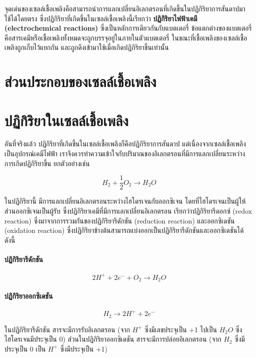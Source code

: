 \message{ !name(solar.tex)}\documentclass[
a4paper,
svgnames,
openany,
justified,
]{tufte-book}
\begin{document}
จุดเด่นของเซลล์เชื้อเพลิงคือสามารถนำการแลกเปลี่ยนอิเลกตรอนที่เกิดขึ้นในปฏิกิริยาการสันดาปมาใช้ได้โดยตรง ซึ่งปฏิกิริยาที่เกิดขึ้นในเซลล์เชื้อเพลิงนี้เรียกว่า \textbf{ปฏิกิริยาไฟฟ้าเคมี (electrochemical reactions)} ซึ่งเป็นหลักการเดียวกันกับแบตเตอรี่ ข้อแตกต่างของแบตเตอรี่คือสารเคมีหรือเชื้อเพลิงทั้งหมดจะถูกบรรจุอยู่ในภายในตัวแบตเตอรี่ ในขณะที่เชื้อเพลิงของเซลล์เชื้อเพลิงถูกเก็บไว้แยกกัน และถูกดึงเข้ามาใช้เมื่อเกิดปฏิกิริยาขึ้นเท่านั้น

\section{ส่วนประกอบของเซลล์เชื้อเพลิง}

\section{ปฏิกิริยาในเซลล์เชื้อเพลิง}

อันที่จริงแล้ว ปฎิกิริยาที่เกิดขึ้นในเซลล์เชื้อเพลิงก็คือปฏิกิริยาการสันดาป แต่เนื่องจากเซลล์เชื้อเพลิงเป็นอุปกรณ์เคมีไฟฟ้า เราจึงควรทำความเข้าใจกับปริมาณของอิเลกตรอนที่มีการแลกเปลี่ยนระหว่างการเกิดปฏิกิริยาขึ้น ยกตัวอย่างเช่น

$$ H_2 + \frac{1}{2} O_2 \rightarrow H_2O $$

ในปฏิกิริยานี้ มีการแลกเปลี่ยนอิเลกตรอนระหว่างไฮโดรเจนกับออกซิเจน โดยที่ไฮโดรเจนเป็นผู้ให้ ส่วนออกซิเจนเป็นผู้รับ ซึ่งปฏิกิริยาเคมีที่มีการแลกเปลี่ยนอิเลกตรอน เรียกว่าปฏิกิริยารีดอกซ์ (redox reaction) ซึ่งมาจากการรวมกันของปฏิกิริยารีดักชัน (reduction reaction) และออกซิเดชัน (oxidation reaction) ซึ่งปฏิกิริยาข้างต้นสามารถแบ่งออกเป็นปฏิกิริยารีดักชันและออกซิเดชันได้ดังนี้

\paragraph{ปฏิกิริยารีดักชัน}

$$ 2H^+ + 2e^- + O_2 \rightarrow H_2O $$

\paragraph{ปฏิกิริยาออกซิเดชัน}

$$ H_2 \rightarrow 2H^+ + 2e^- $$

ในปฏิกิริยารีดักชัน สารจะมีการรับอิเลกตรอน (จาก $H^+$ ซึ่งมีเลขประจุเป็น +1 ไปเป็น $H_2O$ ซึ่งไฮโดรเจนมีประจุเป็น 0) ส่วนในปฏิกิริยาออกซิเดชัน สารจะมีการปล่อยอิเลกตรอน (จาก $H_2$ ซึ่งมีประจุเป็น 0 เป็น $H^+$ ซึ่งมีประจุเป็น +1)
\end{document}
